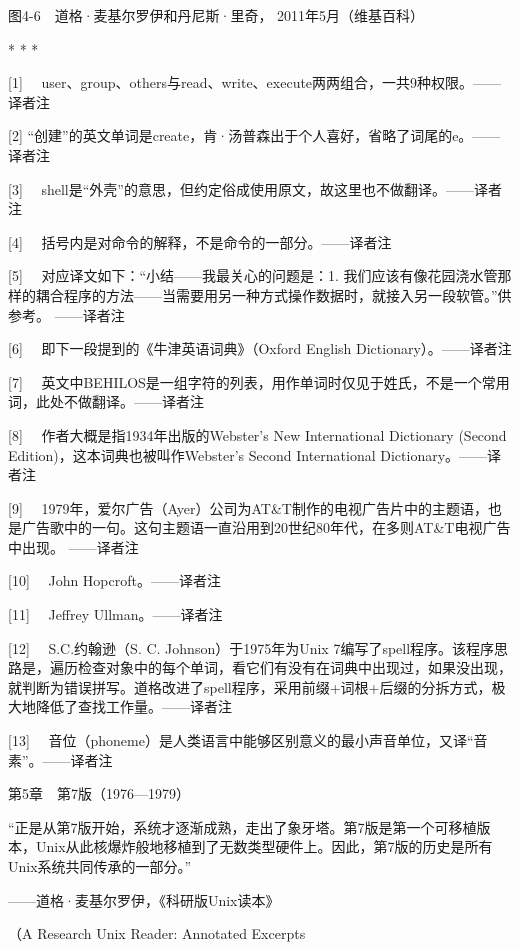 \documentclass[a4paper,12pt,UTF8,twoside]{ctexbook}
\begin{document}
{图4-6　道格·麦基尔罗伊和丹尼斯·里奇， 2011年5月（维基百科）



* * *



[1]　 user、group、others与read、write、execute两两组合，一共9种权限。——译者注

[2] “创建”的英文单词是create，肯·汤普森出于个人喜好，省略了词尾的e。——译者注

[3] 　shell是“外壳”的意思，但约定俗成使用原文，故这里也不做翻译。——译者注

[4] 　括号内是对命令的解释，不是命令的一部分。——译者注

[5] 　对应译文如下：“小结——我最关心的问题是：1. 我们应该有像花园浇水管那样的耦合程序的方法——当需要用另一种方式操作数据时，就接入另一段软管。”供参考。 ——译者注

[6] 　即下一段提到的《牛津英语词典》（Oxford English Dictionary）。——译者注

[7] 　英文中BEHILOS是一组字符的列表，用作单词时仅见于姓氏，不是一个常用词，此处不做翻译。——译者注

[8] 　作者大概是指1934年出版的Webster’s New International Dictionary (Second Edition)，这本词典也被叫作Webster’s Second International Dictionary。——译者注

[9] 　1979年，爱尔广告（Ayer）公司为AT\&T制作的电视广告片中的主题语，也是广告歌中的一句。这句主题语一直沿用到20世纪80年代，在多则AT\&T电视广告中出现。 ——译者注

[10] 　John Hopcroft。——译者注

[11] 　Jeffrey Ullman。——译者注

[12] 　S.C.约翰逊（S. C. Johnson）于1975年为Unix 7编写了spell程序。该程序思路是，遍历检查对象中的每个单词，看它们有没有在词典中出现过，如果没出现，就判断为错误拼写。道格改进了spell程序，采用前缀+词根+后缀的分拆方式，极大地降低了查找工作量。——译者注

[13] 　音位（phoneme）是人类语言中能够区别意义的最小声音单位，又译“音素”。——译者注





第5章　第7版（1976—1979）


“正是从第7版开始，系统才逐渐成熟，走出了象牙塔。第7版是第一个可移植版本，Unix从此核爆炸般地移植到了无数类型硬件上。因此，第7版的历史是所有Unix系统共同传承的一部分。”

——道格·麦基尔罗伊，《科研版Unix读本》

（A Research Unix Reader: Annotated Excerpts

}
\end{document}
